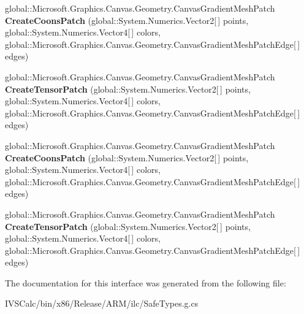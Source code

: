 \begin{DoxyCompactItemize}
global\+::\+Microsoft.\+Graphics.\+Canvas.\+Geometry.\+Canvas\+Gradient\+Mesh\+Patch {\bfseries Create\+Coons\+Patch} (global\+::\+System.\+Numerics.\+Vector2\mbox{[}$\,$\mbox{]} points, global\+::\+System.\+Numerics.\+Vector4\mbox{[}$\,$\mbox{]} colors, global\+::\+Microsoft.\+Graphics.\+Canvas.\+Geometry.\+Canvas\+Gradient\+Mesh\+Patch\+Edge\mbox{[}$\,$\mbox{]} edges)
\item 
\mbox{\label{interface_microsoft_1_1_graphics_1_1_canvas_1_1_geometry_1_1_i_canvas_gradient_mesh_statics_a128a934c6dc2b5cb9ae41b70720dedaf}} 
global\+::\+Microsoft.\+Graphics.\+Canvas.\+Geometry.\+Canvas\+Gradient\+Mesh\+Patch {\bfseries Create\+Tensor\+Patch} (global\+::\+System.\+Numerics.\+Vector2\mbox{[}$\,$\mbox{]} points, global\+::\+System.\+Numerics.\+Vector4\mbox{[}$\,$\mbox{]} colors, global\+::\+Microsoft.\+Graphics.\+Canvas.\+Geometry.\+Canvas\+Gradient\+Mesh\+Patch\+Edge\mbox{[}$\,$\mbox{]} edges)
\item 
\mbox{\label{interface_microsoft_1_1_graphics_1_1_canvas_1_1_geometry_1_1_i_canvas_gradient_mesh_statics_ae8992067a301a411c734f0e902fb4a18}} 
global\+::\+Microsoft.\+Graphics.\+Canvas.\+Geometry.\+Canvas\+Gradient\+Mesh\+Patch {\bfseries Create\+Coons\+Patch} (global\+::\+System.\+Numerics.\+Vector2\mbox{[}$\,$\mbox{]} points, global\+::\+System.\+Numerics.\+Vector4\mbox{[}$\,$\mbox{]} colors, global\+::\+Microsoft.\+Graphics.\+Canvas.\+Geometry.\+Canvas\+Gradient\+Mesh\+Patch\+Edge\mbox{[}$\,$\mbox{]} edges)
\item 
\mbox{\label{interface_microsoft_1_1_graphics_1_1_canvas_1_1_geometry_1_1_i_canvas_gradient_mesh_statics_a128a934c6dc2b5cb9ae41b70720dedaf}} 
global\+::\+Microsoft.\+Graphics.\+Canvas.\+Geometry.\+Canvas\+Gradient\+Mesh\+Patch {\bfseries Create\+Tensor\+Patch} (global\+::\+System.\+Numerics.\+Vector2\mbox{[}$\,$\mbox{]} points, global\+::\+System.\+Numerics.\+Vector4\mbox{[}$\,$\mbox{]} colors, global\+::\+Microsoft.\+Graphics.\+Canvas.\+Geometry.\+Canvas\+Gradient\+Mesh\+Patch\+Edge\mbox{[}$\,$\mbox{]} edges)
\end{DoxyCompactItemize}


The documentation for this interface was generated from the following file\+:\begin{DoxyCompactItemize}
\item 
I\+V\+S\+Calc/bin/x86/\+Release/\+A\+R\+M/ilc/Safe\+Types.\+g.\+cs\end{DoxyCompactItemize}
